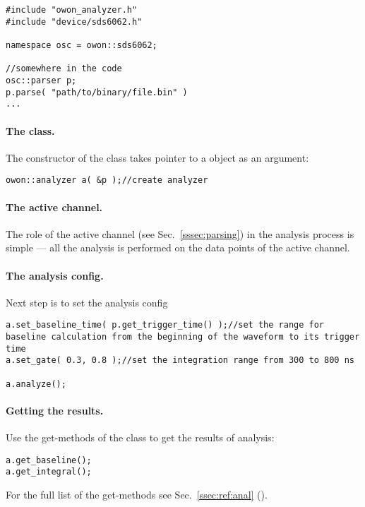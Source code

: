 \begin{lstlisting}
#include "owon_analyzer.h"
#include "device/sds6062.h"

namespace osc = owon::sds6062;

//somewhere in the code
osc::parser p;
p.parse( "path/to/binary/file.bin" )
...
\end{lstlisting}

\paragraph*{The  class.} The constructor of the  class
takes pointer to a  object as an argument:
\begin{lstlisting}
owon::analyzer a( &p );//create analyzer
\end{lstlisting}

\paragraph*{The active channel.} The role of the active channel (see Sec.~\ref{sssec:parsing})
in the analysis process is simple --- all the analysis is performed on the data points
of the active channel.

\paragraph*{The analysis config.} Next step is to set the analysis config

\begin{lstlisting}
a.set_baseline_time( p.get_trigger_time() );//set the range for baseline calculation from the beginning of the waveform to its trigger time
a.set_gate( 0.3, 0.8 );//set the integration range from 300 to 800 ns

a.analyze();
\end{lstlisting}

\paragraph*{Getting the results.} Use the get-methods of the  class to
get the results of analysis:
\begin{lstlisting}
a.get_baseline();
a.get_integral();
\end{lstlisting}
For the full list of the get-methods see Sec.~\ref{ssec:ref:anal} ().

\newpage
